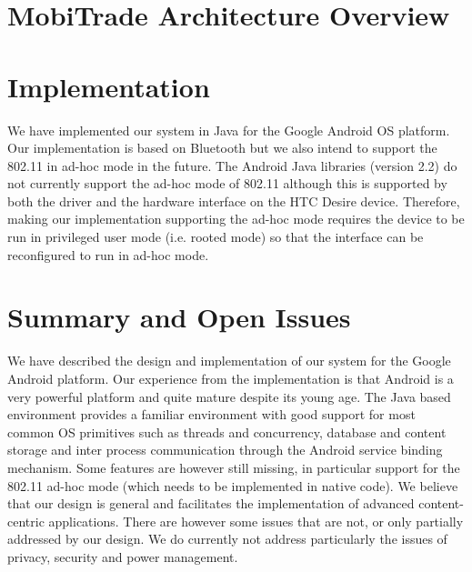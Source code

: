 \section{MobiTrade Architecture Overview}

\section{Implementation}

We have implemented our system in Java for the Google Android OS platform. Our implementation is based on Bluetooth but we also intend to support the 802.11 in ad-hoc
mode in the future. The Android Java libraries (version 2.2) do not currently support the ad-hoc mode of 802.11 although this is supported by both the driver
and the hardware interface on the HTC Desire device. Therefore, making our implementation supporting the ad-hoc mode requires the device to be run in privileged user
mode (i.e. rooted mode) so that the interface can be reconfigured to run in ad-hoc mode.



\section{Summary and Open Issues}

We have described the design and implementation of our system for the Google Android platform. Our experience from the implementation is that Android is a very powerful 
platform and quite mature despite its young age. The Java based environment provides a familiar environment with good support for most common OS primitives such as threads and concurrency, database and content storage and inter process communication through the Android service binding mechanism. Some features are however still missing, in particular support for the 802.11 ad-hoc mode (which needs to be implemented in native code). We believe that our design is general and facilitates the implementation of 
advanced content-centric applications. There are however some issues that are not, or only partially addressed by our design. We do currently not address particularly 
the issues of privacy, security and power management.



